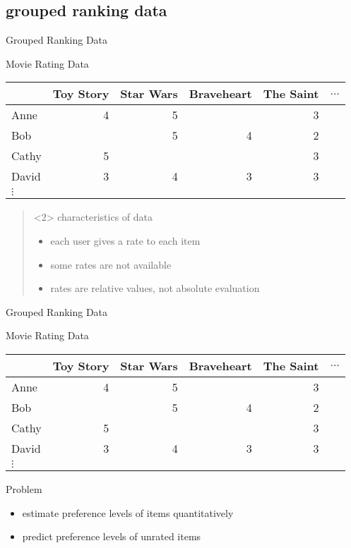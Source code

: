 \documentclass[fleqn,aspectratio=1610]{beamer}
\begin{document}
\subsection{grouped ranking data}
\label{sec:orgba23e82}
\begin{frame}[label={sec:orgc35c1fc}]{Grouped Ranking Data}
\begin{exampleblock}{Movie Rating Data}\label{sec:org38b511a}
\begin{center}
\begin{tabular}{l|rrrrl}
 & Toy Story & Star Wars & Braveheart & The Saint & \(\ldots\)\\[0pt]
\hline
Anne & 4 & 5 &  & 3 & \\[0pt]
Bob &  & 5 & 4 & 2 & \\[0pt]
Cathy & 5 &  &  & 3 & \\[0pt]
David & 3 & 4 & 3 & 3 & \\[0pt]
\(\vdots\) &  &  &  &  & \\[0pt]
\end{tabular}
\end{center}
\end{exampleblock}
\begin{quote}<2> %
characteristics of data
\begin{itemize}
\item each \alert{user} gives a rate to each \alert{item}
\item some rates are not available
\item rates are relative values, not absolute evaluation
\end{itemize}
\end{quote}
\end{frame}
\begin{frame}[label={sec:org13b6d5b}]{Grouped Ranking Data}
\begin{exampleblock}{Movie Rating Data}\label{sec:org6273bd0}
\begin{center}
\begin{tabular}{l|rrrrl}
 & Toy Story & Star Wars & Braveheart & The Saint & \(\ldots\)\\[0pt]
\hline
Anne & 4 & 5 &  & 3 & \\[0pt]
Bob &  & 5 & 4 & 2 & \\[0pt]
Cathy & 5 &  &  & 3 & \\[0pt]
David & 3 & 4 & 3 & 3 & \\[0pt]
\(\vdots\) &  &  &  &  & \\[0pt]
\end{tabular}
\end{center}
\end{exampleblock}
\begin{alertblock}{Problem}
\begin{itemize}
\item estimate preference levels of items quantitatively
\item predict preference levels of unrated items
\end{itemize}
\end{alertblock}
\end{frame}
\end{document}
